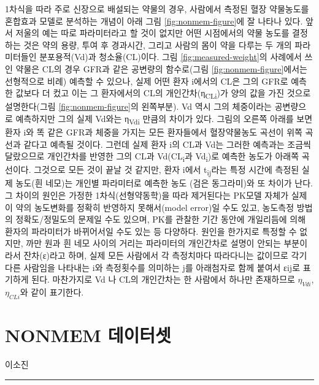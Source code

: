 \documentclass[
  11pt,
  krantz2, a4paper, twoside]{krantz}
\theoremstyle{definition}
\theoremstyle{definition}
\theoremstyle{definition}
\theoremstyle{remark}
\begin{document}
1차식을 따라 주로 신장으로 배설되는 약물의 경우, 사람에서 측정된 혈장 약물농도를 혼합효과 모델로 분석하는 개념이 아래 그림 \ref{fig:nonmem-figure}에 잘 나타나 있다. 앞서 저울의 예는 따로 파라미터라고 할 것이 없지만 어떤 시점에서의 약물 농도를 결정하는 것은 약의 용량, 투여 후 경과시간, 그리고 사람의 몸이 약을 다루는 두 개의 파라미터들인 분포용적(Vd)과 청소율(CL)이다. 그림 \ref{fig:measured-weight}의 사례에서 쓰인 약물은 CL의 경우 GFR과 같은 공변량의 함수로(그림 \ref{fig:nonmem-figure}에서는 선형적으로 비례) 예측할 수 있으나, 실제 어떤 환자 i에서의 CL은 그의 GFR로 예측한 값보다 더 컸고 이는 그 환자에서의 CL의 개인간차(η\textsubscript{CLi})가 양의 값을 가진 것으로 설명한다(그림 \ref{fig:nonmem-figure}의 왼쪽부분). Vd 역시 그의 체중이라는 공변량으로 예측하지만 그의 실제 Vd와는 η\textsubscript{Vdi} 만큼의 차이가 있다. 그림의 오른쪽 아래를 보면 환자 i와 똑 같은 GFR과 체중을 가지는 모든 환자들에서 혈장약물농도 곡선이 위쪽 곡선과 같다고 예측될 것이다. 그런데 실제 환자 i의 CL과 Vd는 그러한 예측과는 조금씩 달랐으므로 개인간차를 반영한 그의 CL과 Vd(CL\textsubscript{i}과 Vd\textsubscript{i})로 예측한 농도가 아래쪽 곡선이다. 그것으로 모든 것이 끝날 것 같지만, 환자 i에서 t\textsubscript{ij}라는 특정 시간에 측정된 실제 농도(흰 네모)는 개인별 파라미터로 예측한 농도 (검은 동그라미)와 또 차이가 난다. 그 차이의 원인은 가정한 1차식(선형약동학)을 따라 제거된다는 PK모델 자체가 실제 이 약의 농도변화를 정확히 반영하지 못해서(model error)일 수도 있고, 농도측정 방법의 정확도/정밀도의 문제일 수도 있으며, PK를 관찰한 기간 동안에 개일리듬에 의해 환자의 파라미터가 바뀌어서일 수도 있는 등 다양하다. 원인을 한가지로 특정할 수 없지만, 까만 원과 흰 네모 사이의 거리는 파라미터의 개인간차로 설명이 안되는 부분이라서 잔차(ε)라고 하며, 실제 모든 사람에서 각 측정치마다 따라다니는 값이므로 각기 다른 사람임을 나타내는 i와 측정횟수를 의미하는 j를 아래첨자로 함께 붙여서 εij로 표기하게 된다. 마찬가지로 Vd 나 CL의 개인간차는 한 사람에서 하나만 존재하므로 \(\eta_{Vdi}\), \(\eta_{CLi}\)와 같이 표기한다.

\hypertarget{nonmem-dataset}{%
\chapter{NONMEM 데이터셋}\label{nonmem-dataset}}

\Large\hfill

이소진
\normalsize

\begin{center}\rule{0.5\linewidth}{0.5pt}\end{center}
\end{document}
